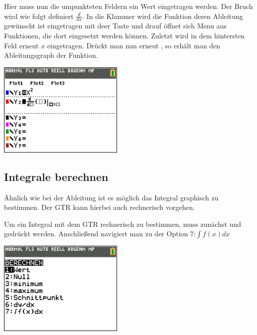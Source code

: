 \begin{paracol}{2}
\begin{flushleft}
	Hier muss nun die umpunkteten Feldern ein Wert eingetragen werden. Der Bruch wird wie folgt definiert $\frac{d}{dx}$. In die Klammer wird die Funktion deren Ableitung gewünscht ist eingetragen mit deer Taste  und  drauf öffnet sich Menu aus Funktionen, die dort eingesetzt werden können. Zuletzt wird in dem hintersten Feld erneut $x$ eingetragen. Drückt man nun erneut , so erhält man den Ableitungsgraph der Funktion.
	\end{flushleft}	
\switchcolumn
\begin{flushright}
\includegraphics[width=6cm]{Media/GRT/Visualisierung/ableitung_bestimmen/ableitung_bestimmen_3.png}
\end{flushright}
\end{paracol}
\pagebreak
\subsection{Integrale berechnen}
Ähnlich wie bei der Ableitung ist es möglich das Integral graphisch zu bestimmen. Der GTR kann hierbei auch rechnerisch vorgehen. 

\begin{paracol}{2}
\begin{flushleft}
	Um ein Integral mit dem GTR rechnerisch zu bestimmen, muss zunächst  und  gedrückt werden. Anschließend navigiert man zu der Option 7:$\int f(x)dx$
\end{flushleft}	
\switchcolumn
\begin{flushright}
	\includegraphics[width=6cm]{Media/GRT/Visualisierung/Integrale_berechnen/Integrale_berechnen_1.png}
\end{flushright}
\end{paracol}

